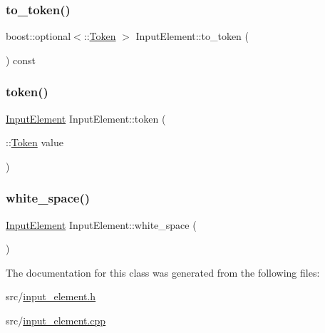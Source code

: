 \mbox{\label{class_input_element_a906f0cb8a60079177f6d4782c8059a56}} 
\subsubsection{\texorpdfstring{to\+\_\+token()}{to\_token()}}
{\footnotesize\ttfamily boost\+::optional$<$\+::\hyperlink{class_token}{Token} $>$ Input\+Element\+::to\+\_\+token (\begin{DoxyParamCaption}{ }\end{DoxyParamCaption}) const}

\mbox{\label{class_input_element_a6ecb5790fd45cd8f8492fa8b4011b817}} 
\subsubsection{\texorpdfstring{token()}{token()}}
{\footnotesize\ttfamily \hyperlink{class_input_element}{Input\+Element} Input\+Element\+::token (\begin{DoxyParamCaption}\item[{\+::\hyperlink{class_token}{Token}}]{value }\end{DoxyParamCaption})\hspace{0.3cm}{\ttfamily [static]}}

\mbox{\label{class_input_element_a06304c0e0c45b213946409300d3fa29b}} 
\subsubsection{\texorpdfstring{white\+\_\+space()}{white\_space()}}
{\footnotesize\ttfamily \hyperlink{class_input_element}{Input\+Element} Input\+Element\+::white\+\_\+space (\begin{DoxyParamCaption}{ }\end{DoxyParamCaption})\hspace{0.3cm}{\ttfamily [static]}}



The documentation for this class was generated from the following files\+:\begin{DoxyCompactItemize}
\item 
src/\hyperlink{input__element_8h}{input\+\_\+element.\+h}\item 
src/\hyperlink{input__element_8cpp}{input\+\_\+element.\+cpp}\end{DoxyCompactItemize}
